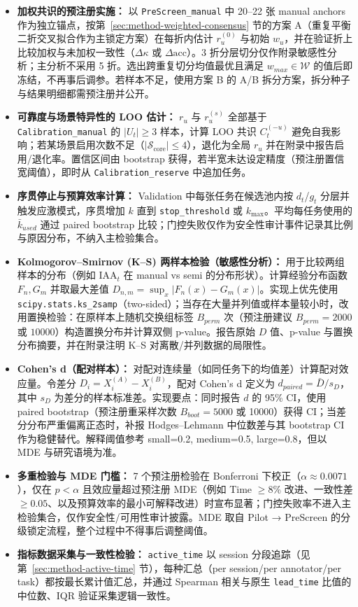 \begin{itemize}
	\item \textbf{加权共识的预注册实施：} 以 \texttt{PreScreen\_manual} 中 20--22 张 manual anchors 作为独立锚点，按第~\ref{sec:method-weighted-consensus} 节的方案 A（重复平衡二折交叉拟合作为主锁定方案）在每折内估计 $r_u^{(0)}$ 与初始 $w_u$，并在验证折上比较加权与未加权一致性（$\Delta\kappa$ 或 $\Delta\mathrm{acc}$）。3 折分层切分仅作附录敏感性分析；主分析不采用 5 折。选出跨重复切分均值最优且满足 $w_{max}\in\mathcal{W}$ 的值后即冻结，不再事后调参。若样本不足，使用方案 B 的 A/B 拆分方案，拆分种子与结果明细都需预注册并公开。
	\item \textbf{可靠度与场景特异性的 LOO 估计：} $r_u$ 与 $r_u^{(s)}$ 全部基于 \texttt{Calibration\_manual} 的 $|U_t|\geq3$ 样本，计算 LOO 共识 $C_t^{(-u)}$ 避免自我影响；若某场景启用次数不足（$|\mathcal{S}_{\mathrm{core}}|\leq4$），退化为全局 $r_u$ 并在附录中报告启用/退化率。置信区间由 bootstrap 获得，若半宽未达设定精度（预注册置信宽阈值），即时从 \texttt{Calibration\_reserve} 中追加任务。
	\item \textbf{序贯停止与预算效率计算：} Validation 中每张任务在候选池内按 $d_t$/$g_t$ 分层并触发应激模式，序贯增加 $k$ 直到 \texttt{stop\_threshold} 或 $k_{\max}$。平均每任务使用的 $\bar{k}_{used}$ 通过 paired bootstrap 比较；门控失败仅作为安全性审计事件记录其比例与原因分布，不纳入主检验集合。
	\item \textbf{Kolmogorov--Smirnov (K--S) 两样本检验（敏感性分析）：} 用于比较两组样本的分布（例如 $\mathrm{IAA}_t$ 在 manual vs semi 的分布形状）。计算经验分布函数 $F_n,G_m$ 并取最大差值 $D_{n,m}=\sup_x|F_n(x)-G_m(x)|$。实现上优先使用 \texttt{scipy.stats.ks\_2samp}（two-sided）；当存在大量并列值或样本量较小时，改用置换检验：在原样本上随机交换组标签 $B_{perm}$ 次（预注册建议 $B_{perm}=2000$ 或 $10000$）构造置换分布并计算双侧 p-value。报告原始 $D$ 值、p-value 与置换分布摘要，并在附录注明 K--S 对离散/并列数据的局限性。
	\item \textbf{Cohen's d（配对样本）：} 对配对连续量（如同任务下的均值差）计算配对效应量。令差分 $D_i=X_i^{(A)}-X_i^{(B)}$，配对 Cohen's d 定义为 $d_{paired}=\bar{D}/s_D$，其中 $s_D$ 为差分的样本标准差。实现要点：同时报告 $d$ 的 95\% CI，使用 paired bootstrap（预注册重采样次数 $B_{boot}=5000$ 或 10000）获得 CI；当差分分布严重偏离正态时，补报 Hodges--Lehmann 中位数差与其 bootstrap CI 作为稳健替代。解释阈值参考 small=0.2, medium=0.5, large=0.8，但以 MDE 与研究语境为准。
	\item \textbf{多重检验与 MDE 门槛：} 7 个预注册检验在 Bonferroni 下校正（$\alpha\approx 0.0071$），仅在 $p<\alpha$ 且效应量超过预注册 MDE（例如 Time $\geq8\%$ 改进、一致性差 $\geq0.05$、以及预算效率的最小可解释改进）时宣布显著；门控失败率不进入主检验集合，仅作安全性/可用性审计披露。MDE 取自 Pilot → PreScreen 的分级锁定流程，整个过程中不得事后调整阈值。
	\item \textbf{指标数据采集与一致性检验：} \texttt{active\_time} 以 session 分段追踪（见第~\ref{sec:method-active-time} 节），每种汇总（per session/per annotator/per task）都按最长累计值汇总，并通过 Spearman 相关与原生 \texttt{lead\_time} 比值的中位数、IQR 验证采集逻辑一致性。
\end{itemize}

